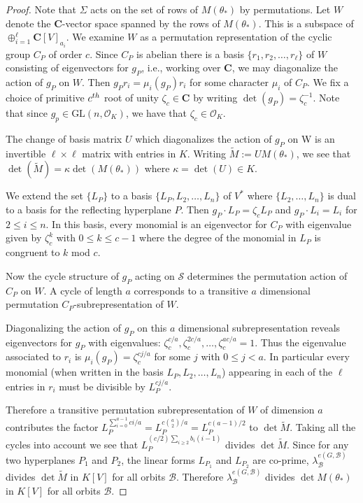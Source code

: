 \documentclass[10pt,a4paper]{amsart}
\newcommand{\CC}{\mathbf{C}} %
\def\GL{\text{GL}}
\newcommand{\KK}{K}
\newcommand{\OK}{{{\mathcal O}_K}}
\providecommand{\binom}[2]{{#1\choose#2}}
\newcommand{\bth}{{{\theta_*}}} %
\newcommand{\calb}{\mathcal{B}}
\newcommand{\cals}{\mathcal{S}}
\renewcommand{\geq}{\geqslant}
\renewcommand{\leq}{\leqslant}
\newcommand{\set}[1]{\{#1\}}
\begin{document}
 \begin{proof}
 Note that $\Sigma$ acts on the set of rows of $M(\theta_*)$ by permutations.
 Let $W$ denote the $\CC$-vector space spanned by the rows of $M(\theta_*)$.  
 This is a subspace of $\oplus_{i=1}^\ell \CC[V]_{a_i}$.  
 We examine $W$ as a permutation representation of the cyclic group $C_P$ of order $c$.
 Since $C_P$ is abelian there is a basis $\set{r_1,r_2,\dots,r_\ell}$ of $W$ consisting of eigenvectors for $g_P$,
 i.e., working over $\CC$, we may diagonalize the action of $g_P$  on $W$.   Then $g_P r_i = \mu_i(g_P) r_i$ for some character $\mu_i$ of $C_P$.  We fix a choice of primitive $c^{\rm{th}}$ root of unity $\zeta_c\in\CC$ by writing $\det(g_P)=\zeta_c^{-1}$. 
 Note that since $g_p \in \GL(n,\OK)$, we have that $\zeta_c \in \OK$.

 The change of basis matrix $U$ which diagonalizes the 
 action of $g_P$ on W is an
invertible $\ell \times \ell$ matrix with entries in $K$.
Writing $\widetilde M := U M(\bth)$, we see that 
$\det (\widetilde M) = \kappa \det(M(\bth))$ where 
$\kappa = \det(U) \in K$.

We extend the set $\{L_P\}$
to a basis $\{L_P,L_2,\dots,L_n\}$ of $V^*$ where $\{L_2,\dots,L_n\}$ is dual to a basis for the reflecting hyperplane $P$.
Then $g_P \cdot L_P = \zeta_c L_P$ and $g_P \cdot L_i = L_i$
for $2 \leq i \leq n$.  
In this basis, every monomial is an eigenvector for $C_P$
with eigenvalue given by $\zeta_c^k$ with 
$0 \leq k \leq c-1$ where the degree of the monomial in $L_P$
is congruent to $k$ mod $c$.



 Now the cycle structure of $g_P$ acting on $\cals$ determines the permutation action of $C_P$ on $W$.
 A cycle of length $a$ corresponds to a transitive $a$ dimensional permutation $C_P$-subrepresentation of $W$.
 
  Diagonalizing the action of $g_P$ on this $a$ dimensional subrepresentation reveals eigenvectors for $g_P$
 with eigenvalues: $\zeta_{c}^{c/a}, \zeta_{c}^{2c/a},\dots,\zeta_{c}^{ac/a}=1$.
Thus the eigenvalue associated to $r_i$ is
$\mu_i(g_P)=\zeta_c^{cj/a}$ for some $j$ with
$0 \leq j < a$.  
In particular every monomial (when written in the basis $L_P, L_2,\dots, L_n$) appearing in 
each of the $\ell$ entries in $r_i$ must be divisible by $L_P^{c j/a}$.

Therefore a transitive permutation subrepresentation of $W$ of dimension $a$ 
contributes the factor 
$L_P^{\sum_{i=0}^{a-1} c i/a} = L_P^{c\binom{a}{2}/a}=L_P^{c(a-1)/2}$ to $\det \widetilde{M}$. 
 Taking all the cycles into account we see that
 $L_P^{(c/2)\sum_{i \geq 2} b_i(i-1)}$ divides 
 $\det \widetilde{M}$.
 Since for any two hyperplanes $P_1$ and $P_2$, the linear forms
 $L_{P_1}$ and $L_{P_2}$ are co-prime,  
  $\lambda_\calb^{e(G,\calb)}$ divides $\det \widetilde{M}$ in $\KK[V]$ for all orbits $\calb$.
  Therefore $\lambda_\calb^{e(G,\calb)}$ divides 
  $\det M(\bth)$ in $\KK[V]$ for all orbits $\calb$.
\end{proof}
\end{document}
